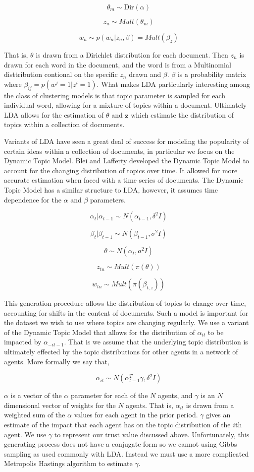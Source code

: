 \documentclass[a4paper]{article}
\begin{document}
\[\theta_m \sim \text{Dir}(\alpha)\]

\[z_n \sim Mult(\theta_m)\]

\[w_n \sim p(w_n | z_n, \beta) = Mult(\beta_z)\]

That is, $\theta$ is drawn from a Dirichlet distribution for each document.  Then $z_n$ is drawn for each word in the document, and the word is from a Multinomial disttribution contional on the specific $z_n$ drawn and $\beta$.  $\beta$ is a probability matrix where $\beta_{ij} = p(w^j = 1|z^i =1)$.  What makes LDA particularly interesting among the class of clustering models is that topic parameter is sampled for each individual word, allowing for a mixture of topics within a document.  Ultimately LDA allows for the estimation of $\theta$ and $\textbf{z}$ which estimate the distribution of topics within a collection of documents.

Variants of LDA have seen a great deal of success for modeling the popularity of certain ideas within a collection of documents, in particular we focus on the Dynamic Topic Model.  Blei and Lafferty developed the Dynamic Topic Model to account for the changing distribution of topics over time.  It allowed for more accurate estimation when faced with a time series of documents.  The Dynamic Topic Model has a similar structure to LDA, however, it assumes time dependence for the $\alpha$ and $\beta$ parameters.

\[\alpha_t | \alpha_{t-1} \sim N(\alpha_{t-1}, \delta^2I)\]

\[\beta_t | \beta_{t-1} \sim N(\beta_{t-1}, \sigma^2I)\]

\[\theta \sim N(\alpha_t, a^2I)\]

\[z_{tn} \sim Mult(\pi(\theta))\]

\[w_{tn} \sim Mult(\pi(\beta_{t, z}))\]

This generation procedure allows the distribution of topics to change over time, accounting for shifts in the content of documents.  Such a model is important for the dataset we wish to use where topics are changing regularly.  We use a variant of the Dynamic Topic Model that allows for the distribution of $\alpha_{it}$ to be impacted by $\alpha_{-it-1}$.  That is we assume that the underlying topic distribution is ultimately effected by the topic distributions for other agents in a network of agents.  More formally we say that,

\[\alpha_{it} \sim N(\alpha_{t-1}^T \gamma, \delta^2I)\]

$\alpha$ is a vector of the $\alpha$ parameter for each of the $N$ agents, and $\gamma$ is an $N$ dimensional vector of weights for the $N$ agents.  That is, $\alpha_{it}$ is drawn from a weighted sum of the $\alpha$ values for each agent in the prior period.  $\gamma$ gives an estimate of the impact that each agent has on the topic distribution of the $i$th agent.  We use $\gamma$ to represent our trust value discussed above.  Unfortunately, this generating process does not have a conjugate form so we cannot using Gibbs sampling as used commonly with LDA.  Instead we must use a more complicated Metropolis Hastings algorithm to estimate $\gamma$.
\end{document}
